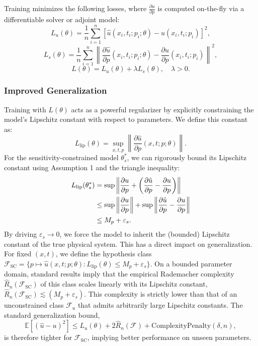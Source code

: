 Training minimizes the following losses, where $\frac{\partial u}{\partial p}$ is computed on-the-fly via a differentiable solver or adjoint model:
\begin{equation}
L_u(\theta) = \frac{1}{n} \sum_{i=1}^n [\hat{u}(x_i, t_i; p_i;\theta) - u(x_i, t_i; p_i)]^2,
\end{equation}
\begin{equation}
L_s(\theta) = \frac{1}{n} \sum_{i=1}^n \left\| \frac{\partial \hat{u}}{\partial p}(x_i, t_i; p_i;\theta) - \frac{\partial u}{\partial p}(x_i, t_i; p_i) \right\|^2,
\end{equation}
\begin{equation}
L(\theta) = L_u(\theta) + \lambda L_s(\theta), \quad \lambda > 0.
\end{equation}


\subsubsection*{Improved Generalization}

Training with $L(\theta)$ acts as a powerful regularizer by explicitly constraining the model's Lipschitz constant with respect to parameters. We define this constant as:
\begin{equation}
L_{\text{lip}}(\theta) = \sup_{x,t,p} \left\| \frac{\partial \hat{u}}{\partial p}(x,t;p;\theta) \right\|.
\end{equation}
For the sensitivity-constrained model $\theta_s^*$, we can rigorously bound its Lipschitz constant using Assumption 1 and the triangle inequality:
\begin{align}
L_{\text{lip}}(\theta_s^*) &= \sup \left\| \frac{\partial u}{\partial p} + \left( \frac{\partial \hat{u}}{\partial p} - \frac{\partial u}{\partial p} \right) \right\| \notag \\
&\le \sup \left\| \frac{\partial u}{\partial p} \right\| + \sup \left\| \frac{\partial \hat{u}}{\partial p} - \frac{\partial u}{\partial p} \right\| \notag \\
&\le M_p + \varepsilon_s.
\end{align}
By driving $\varepsilon_s \to 0$, we force the model to inherit the (bounded) Lipschitz constant of the true physical system. This has a direct impact on generalization. For fixed $(x,t)$, we define the hypothesis class $\mathcal{F}_{\text{SC}} = \{p \mapsto \hat{u}(x,t;p;\theta): L_{\text{lip}}(\theta) \le M_p+\varepsilon_s\}$. On a bounded parameter domain, standard results imply that the empirical Rademacher complexity $\hat{R}_n(\mathcal{F}_{\text{SC}})$ of this class scales linearly with its Lipschitz constant, $\hat{R}_n(\mathcal{F}_{\text{SC}}) \lesssim (M_p + \varepsilon_s)$. This complexity is strictly lower than that of an unconstrained class $\mathcal{F}_u$ that admits arbitrarily large Lipschitz constants. The standard generalization bound,
\begin{equation}
\mathbb{E}[(\hat{u} - u)^2] \leq L_u(\theta) + 2 \hat{R}_n(\mathcal{F}) + \text{ComplexityPenalty}(\delta, n),
\end{equation}
is therefore tighter for $\mathcal{F}_{\text{SC}}$, implying better performance on unseen parameters.


